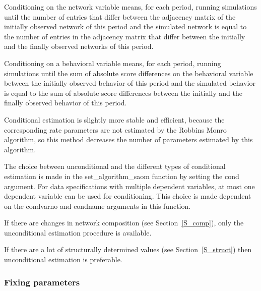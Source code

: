 \documentclass[a4paper,fleqn,11pt]{article}
\newcommand{\+}{\, + \,}
\begin{document}
Conditioning on the network variable means, for each period,
running simulations until the number of entries that differ
between the adjacency matrix of the
initially observed network of this period and the simulated network
\hypertarget{T_distance_stop}{is equal to the number} of entries
in the adjacency matrix that differ between the initially and the
finally observed networks of this period.

Conditioning on a behavioral variable means, for each period, running
simulations until the sum of absolute score differences on the behavioral
variable between the initially observed behavior of this period
and the simulated behavior is equal to the sum of absolute score
differences between the initially and the finally observed
behavior of this period.

Conditional estimation is slightly more stable and efficient,
because the corresponding rate parameters are not estimated by the
Robbins Monro algorithm, so this method decreases the number of
parameters estimated by this algorithm.
\medskip

The choice between
unconditional and the different types of conditional estimation is
made in the \textsf{set\_algorithm\_saom} function by setting the
\textsf{cond} argument.
For data specifications with multiple dependent variables,
at most one dependent variable can be used for conditioning.
This choice is made dependent on the
\textsf{condvarno} and \textsf{condname} arguments in this function.

If there are changes in network composition (see
Section~\ref{S_comp}), only the unconditional estimation procedure
is available.

If there are a lot of structurally determined values (see Section~\ref{S_struct})
then unconditional estimation is preferable.


\subsubsection{Fixing parameters}
\label{S_fixingparameters}
\end{document}
